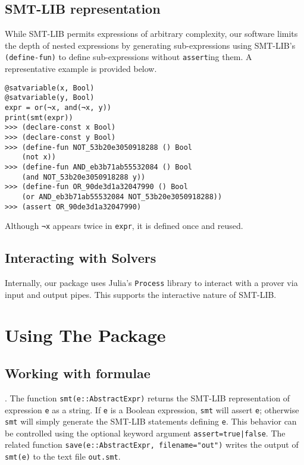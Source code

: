 \documentclass[conference]{IEEEtran}
\begin{document}
\subsection{SMT-LIB representation}

While SMT-LIB permits expressions of arbitrary complexity, our software limits the depth of nested expressions by generating sub-expressions using SMT-LIB's \verb|(define-fun)| to define sub-expressions without \verb|assert|ing them. %
A representative example is provided below.
\begin{verbatim}
@satvariable(x, Bool)
@satvariable(y, Bool)
expr = or(¬x, and(¬x, y))
print(smt(expr))
>>> (declare-const x Bool)
>>> (declare-const y Bool)
>>> (define-fun NOT_53b20e3050918288 () Bool
    (not x))
>>> (define-fun AND_eb3b71ab55532084 () Bool
    (and NOT_53b20e3050918288 y))
>>> (define-fun OR_90de3d1a32047990 () Bool
    (or AND_eb3b71ab55532084 NOT_53b20e3050918288))
>>> (assert OR_90de3d1a32047990)
\end{verbatim}
Although \verb|¬x| appears twice in \verb|expr|, it is defined once and reused.

\subsection{Interacting with Solvers}
Internally, our package uses Julia's \verb|Process| library to interact with a prover via input and output pipes. This supports the interactive nature of SMT-LIB.%

\section{Using The Package}
\subsection{Working with formulae}.
The function \verb|smt(e::AbstractExpr)| returns the SMT-LIB representation of expression \verb|e| as a string. If \verb|e| is a Boolean expression, \verb|smt| will assert \verb|e|; otherwise \verb|smt| will simply generate the SMT-LIB statements defining \verb|e|. This behavior can be controlled using the optional keyword argument \texttt{assert=true|false}. The related function \verb|save(e::AbstractExpr, filename="out")| writes the output of \verb|smt(e)| to the text file \verb|out.smt|.
\end{document}
